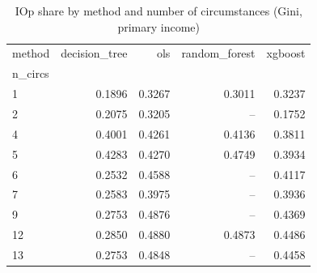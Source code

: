 \begin{table}
\caption{IOp share by method and number of circumstances (Gini, primary income)}
\label{tab:method_sensitivity}
\begin{tabular}{lrrrr}
\toprule
method & decision_tree & ols & random_forest & xgboost \\
n_circs &  &  &  &  \\
\midrule
1 & 0.1896 & 0.3267 & 0.3011 & 0.3237 \\
2 & 0.2075 & 0.3205 & -- & 0.1752 \\
4 & 0.4001 & 0.4261 & 0.4136 & 0.3811 \\
5 & 0.4283 & 0.4270 & 0.4749 & 0.3934 \\
6 & 0.2532 & 0.4588 & -- & 0.4117 \\
7 & 0.2583 & 0.3975 & -- & 0.3936 \\
9 & 0.2753 & 0.4876 & -- & 0.4369 \\
12 & 0.2850 & 0.4880 & 0.4873 & 0.4486 \\
13 & 0.2753 & 0.4848 & -- & 0.4458 \\
\bottomrule
\end{tabular}
\end{table}
